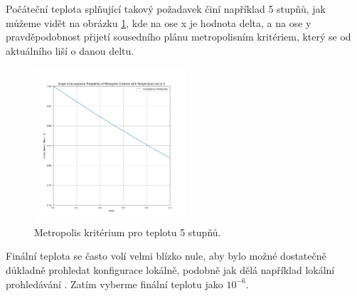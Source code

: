 Počáteční teplota splňující takový požadavek činí například 5 stupňů, jak můžeme vidět na obrázku \ref{img:metropolis_5},
kde na ose x je hodnota delta, a na ose y pravděpodobnost přijetí sousedního plánu metropolisním kritériem, který se od aktuálního liší o danou deltu.

\begin{figure}[H]
  \centering
\includegraphics[width=0.5\textwidth,height=0.5\textwidth]{img/metropolis_5.png}
  \caption{Metropolis kritérium pro teplotu 5 stupňů.}
  \label{img:metropolis_5}
\end{figure}

Finální teplota se často volí velmi blízko nule, aby bylo možné dostatečně důkladně prohledat konfigurace lokálně, podobně jak dělá například lokální prohledávání \cite{sa_theory}.
Zatím vyberme finální teplotu jako $10^{-6}$.

